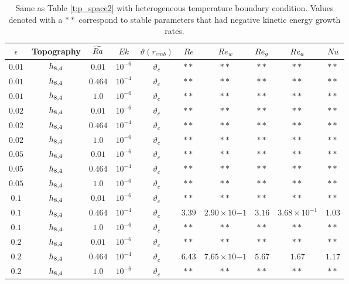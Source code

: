 \begin{table}
\label{t:p_space2}
\end{table}\begin{table}
\begin{center}
\begin{tabular}{c c c c c c c c c c}
	\hline
\hline
$\epsilon$ & Topography & $\widetilde{Ra}$ & $Ek$ & $\vartheta(r_{cmb})$ & $Re$ & $Re_w$ & $Re_{{g}}$ & $Re_{{a}}$ & $Nu$\\
\hline
$0.01$ & $h_{8,4}$ & $0.01$ & $10^{-6}$ & $\vartheta_c$&$**$ & $**$ & $**$ & $**$ & $**$ \\
 $0.01$ & $h_{8,4}$ & $0.464$ & $10^{-4}$ & $\vartheta_c$&$**$ & $**$ & $**$ & $**$ & $**$ \\
 $0.01$ & $h_{8,4}$ & $1.0$ & $10^{-6}$ & $\vartheta_c$&$**$ & $**$ & $**$ & $**$ & $**$ \\
 $0.02$ & $h_{8,4}$ & $0.01$ & $10^{-6}$ & $\vartheta_c$&$**$ & $**$ & $**$ & $**$ & $**$ \\
 $0.02$ & $h_{8,4}$ & $0.464$ & $10^{-4}$ & $\vartheta_c$&$**$ & $**$ & $**$ & $**$ & $**$ \\
 $0.02$ & $h_{8,4}$ & $1.0$ & $10^{-6}$ & $\vartheta_c$&$**$ & $**$ & $**$ & $**$ & $**$ \\
 $0.05$ & $h_{8,4}$ & $0.01$ & $10^{-6}$ & $\vartheta_c$&$**$ & $**$ & $**$ & $**$ & $**$ \\
 $0.05$ & $h_{8,4}$ & $0.464$ & $10^{-4}$ & $\vartheta_c$&$**$ & $**$ & $**$ & $**$ & $**$ \\
 $0.05$ & $h_{8,4}$ & $1.0$ & $10^{-6}$ & $\vartheta_c$&$**$ & $**$ & $**$ & $**$ & $**$ \\
 $0.1$ & $h_{8,4}$ & $0.01$ & $10^{-6}$ & $\vartheta_c$&$**$ & $**$ & $**$ & $**$ & $**$ \\
 $0.1$ & $h_{8,4}$ & $0.464$ & $10^{-4}$ & $\vartheta_c$&$3.39$ & $2.90\times 10{-1}$ & $3.16$ & $3.68\times 10^{-1}$ & $1.03$ \\
 $0.1$ & $h_{8,4}$ & $1.0$ & $10^{-6}$ & $\vartheta_c$&$**$ & $**$ & $**$ & $**$ & $**$ \\
 $0.2$ & $h_{8,4}$ & $0.01$ & $10^{-6}$ & $\vartheta_c$&$**$ & $**$ & $**$ & $**$ & $**$ \\
 $0.2$ & $h_{8,4}$ & $0.464$ & $10^{-4}$ & $\vartheta_c$&$6.43$ & $7.65\times10{-1}$ & $5.67$ & $1.67$ & $1.17$ \\
 $0.2$ & $h_{8,4}$ & $1.0$ & $10^{-6}$ & $\vartheta_c$&$**$ & $**$ & $**$ & $**$ & $**$ \\
 \hline
 \hline
 \end{tabular}
\end{center}
\caption[Run parameters for turbulent simulations with hetereogeneous boundary condition]{Same as Table \ref{t:p_space2} with heterogeneous temperature boundary condition.  Values denoted with a $**$ correspond to stable parameters that had negative kinetic energy growth rates.} 
\label{t:p_space3}
\end{table}
